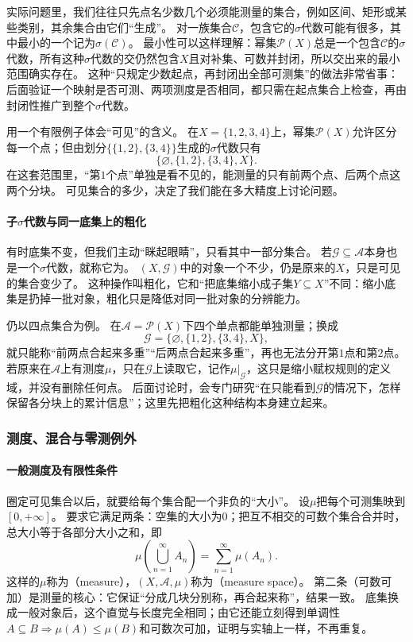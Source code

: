 实际问题里，我们往往只先点名少数几个必须能测量的集合，例如区间、矩形或某些类别，其余集合由它们“生成”。
对一族集合$\mathcal C$，包含它的$\sigma$代数可能有很多，其中最小的一个记为$\sigma(\mathcal C)$。
最小性可以这样理解：幂集$\mathcal P(X)$总是一个包含$\mathcal C$的$\sigma$代数，所有这种$\sigma$代数的交仍然包含$X$且对补集、可数并封闭，所以交出来的最小范围确实存在。
这种“只规定少数起点，再封闭出全部可测集”的做法非常省事：后面验证一个映射是否可测、两项测度是否相同，都只需在起点集合上检查，再由封闭性推广到整个$\sigma$代数。

用一个有限例子体会“可见”的含义。
在$X=\{1,2,3,4\}$上，幂集$\mathcal P(X)$允许区分每一个点；但由划分$\bigl\{\{1,2\},\{3,4\}\bigr\}$生成的$\sigma$代数只有
\[
 \bigl\{\varnothing,\{1,2\},\{3,4\},X\bigr\}.
\]
在这套范围里，“第$1$个点”单独是看不见的，能测量的只有前两个点、后两个点这两个分块。
可见集合的多少，决定了我们能在多大精度上讨论问题。

\paragraph{子$\sigma$代数与同一底集上的粗化}

有时底集不变，但我们主动“眯起眼睛”，只看其中一部分集合。
若$\mathcal G\subseteq\mathcal A$本身也是一个$\sigma$代数，就称它为。
$(X,\mathcal G)$中的对象一个不少，仍是原来的$X$，只是可见的集合变少了。
这种操作叫粗化，它和“把底集缩小成子集$Y\subseteq X$”不同：缩小底集是扔掉一批对象，粗化只是降低对同一批对象的分辨能力。

仍以四点集合为例。
在$\mathcal A=\mathcal P(X)$下四个单点都能单独测量；换成
\[
 \mathcal G=\{\varnothing,\{1,2\},\{3,4\},X\},
\]
就只能称“前两点合起来多重”“后两点合起来多重”，再也无法分开第$1$点和第$2$点。
若原来在$\mathcal A$上有测度$\mu$，只在$\mathcal G$上读取它，记作$\mu|_{\mathcal G}$，这只是缩小赋权规则的定义域，并没有删除任何点。
后面讨论时，会专门研究“在只能看到$\mathcal G$的情况下，怎样保留各分块上的累计信息”；这里先把粗化这种结构本身建立起来。

\subsubsection{测度、混合与零测例外}

\paragraph{一般测度及有限性条件}

圈定可见集合以后，就要给每个集合配一个非负的“大小”。
设$\mu$把每个可测集映到$[0,+\infty]$。
要求它满足两条：空集的大小为$0$；把互不相交的可数个集合合并时，总大小等于各部分大小之和，即
\[
 \mu\!\left(\bigcup_{n=1}^{\infty}A_n\right)=\sum_{n=1}^{\infty}\mu(A_n).
\]
这样的$\mu$称为（measure），$(X,\mathcal A,\mu)$称为（measure space）。
第二条（可数可加）是测量的核心：它保证“分成几块分别称，再合起来称”，结果一致。
底集换成一般对象后，这个直觉与长度完全相同；由它还能立刻得到单调性$A\subseteq B\Rightarrow\mu(A)\leq\mu(B)$和可数次可加，证明与实轴上一样，不再重复。


